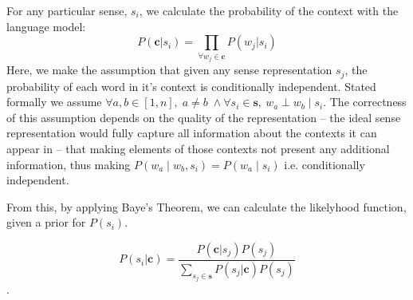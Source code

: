 \documentclass{sig-alternate}
\begin{document}
For any particular sense, $s_i$, we calculate the probability of the context with the language model: \[P(\mathbf{c}|s_{i})=\prod_{\forall w_{j}\in\mathbf{c}}P(w_{j}|s_{i})\]
Here, we make the assumption that given any sense representation $s_j$, the probability of each word in it's context is conditionally independent. Stated formally we assume $\forall a,b \in [1,n],\; a \ne b\; \wedge \forall s_i \in \mathbf{s},\:w_a \perp w_b \mid s_i$.
The correctness of this assumption depends on the quality of the representation -- the ideal sense representation would fully capture all information about the contexts it can appear in -- that making elements of those contexts not present any additional information, thus making $P(w_a \mid w_b,s_i)=P(w_a \mid s_i)$ i.e. conditionally independent.

From this, by applying Baye's Theorem, we can calculate the likelyhood function, given a prior for $P(s_i)$.

\[P(s_{i}|\mathbf{c}) = \dfrac{P(\mathbf{c}|s_{j})P(s_{j})}{\sum_{s_{j}\in\mathbf{s}}P(s_{j}|\mathbf{c})P(s_{j})}\].
\end{document}
